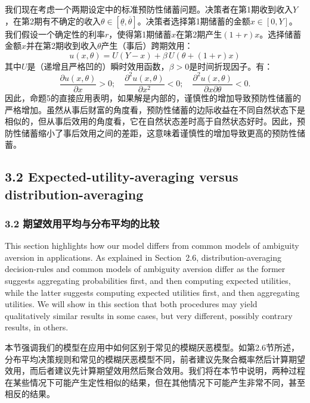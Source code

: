 \documentclass[12pt,a4paper]{article}
\newenvironment{original}
  {\par\noindent\ignorespaces}
  {\par}
\newenvironment{translation}
  {\par\noindent{\color{transblue}\ignorespaces}}
  {\par\medskip}
\begin{document}
\begin{translation}
我们现在考虑一个两期设定中的标准预防性储蓄问题。决策者在第1期收到收入$Y$，在第2期有不确定的收入$\theta \in [\underline{\theta}, \overline{\theta}]$。决策者选择第1期储蓄的金额$x \in [0, Y]$。我们假设一个确定性的利率$r$，使得第1期储蓄$x$在第2期产生$(1+r)x$。选择储蓄金额$x$并在第2期收到收入$\theta$产生（事后）跨期效用：
\[
u(x, \theta) = U(Y - x) + \beta \, U(\theta + (1+r)x)
\]
其中$U$是（递增且严格凹的）瞬时效用函数，$\beta > 0$是时间折现因子。有：
\[
\frac{\partial u(x,\theta)}{\partial x} > 0; \quad \frac{\partial^{2} u(x,\theta)}{\partial x^{2}} < 0; \quad \frac{\partial^{2} u(x,\theta)}{\partial x \partial \theta} < 0.
\]
因此，命题5的直接应用表明，如果解是内部的，谨慎性的增加导致预防性储蓄的严格增加。虽然从事后财富的角度看，预防性储蓄的边际收益在不同自然状态下是相似的，但从事后效用的角度看，它在自然状态差时高于自然状态好时。因此，预防性储蓄缩小了事后效用之间的差距，这意味着谨慎性的增加导致更高的预防性储蓄。
\end{translation}

\subsection{3.2 Expected-utility-averaging versus distribution-averaging}
{\color{transblue}\subsubsection*{3.2 期望效用平均与分布平均的比较}}

\begin{original}
This section highlights how our model differs from common models of ambiguity aversion in applications. As explained in Section~2.6, distribution-averaging decision-rules and common models of ambiguity aversion differ as the former suggests aggregating probabilities first, and then computing expected utilities, while the latter suggests computing expected utilities first, and then aggregating utilities. We will show in this section that both procedures may yield qualitatively similar results in some cases, but very different, possibly contrary results, in others.
\end{original}

\begin{translation}
本节强调我们的模型在应用中如何区别于常见的模糊厌恶模型。如第2.6节所述，分布平均决策规则和常见的模糊厌恶模型不同，前者建议先聚合概率然后计算期望效用，而后者建议先计算期望效用然后聚合效用。我们将在本节中说明，两种过程在某些情况下可能产生定性相似的结果，但在其他情况下可能产生非常不同，甚至相反的结果。
\end{translation}
\end{document}
